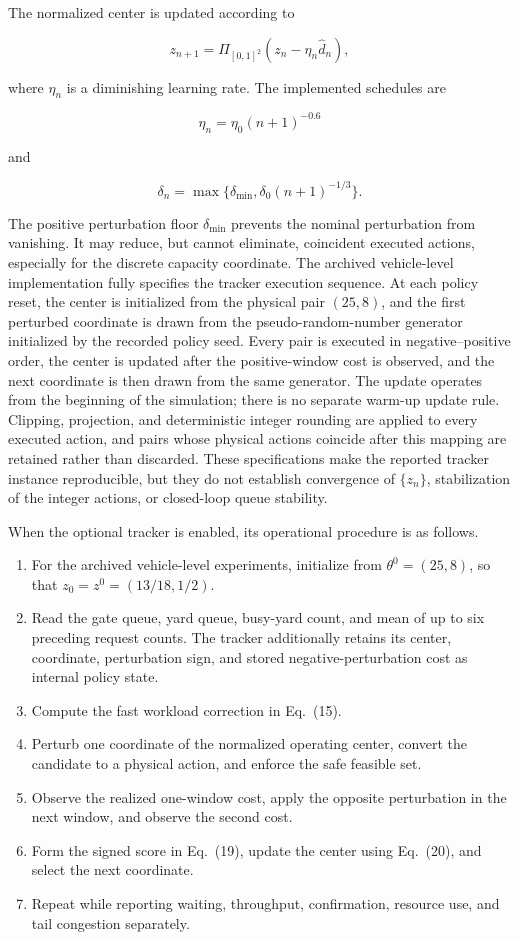 \documentclass[preprint,12pt,authoryear,a4paper]{elsarticle}
\begin{document}
The normalized center is updated according to

\[
z_{n+1}
=\Pi_{[0,1]^2}
\left(z_n-\eta_n\widehat d_n\right),
\tag{20}
\]

where \(\eta_n\) is a diminishing learning rate. The implemented schedules are

\[
\eta_n=\eta_0(n+1)^{-0.6}
\tag{21}
\]

and

\[
\delta_n=\max\{\delta_{\min},\delta_0(n+1)^{-1/3}\}.
\tag{22}
\]

The positive perturbation floor \(\delta_{\min}\) prevents the nominal perturbation from vanishing. It may reduce, but cannot eliminate, coincident executed actions, especially for the discrete capacity coordinate. The archived vehicle-level implementation fully specifies the tracker execution sequence. At each policy reset, the center is initialized from the physical pair \((25,8)\), and the first perturbed coordinate is drawn from the pseudo-random-number generator initialized by the recorded policy seed. Every pair is executed in negative--positive order, the center is updated after the positive-window cost is observed, and the next coordinate is then drawn from the same generator. The update operates from the beginning of the simulation; there is no separate warm-up update rule. Clipping, projection, and deterministic integer rounding are applied to every executed action, and pairs whose physical actions coincide after this mapping are retained rather than discarded. These specifications make the reported tracker instance reproducible, but they do not establish convergence of \(\{z_n\}\), stabilization of the integer actions, or closed-loop queue stability.

When the optional tracker is enabled, its operational procedure is as follows.

\begin{enumerate}[leftmargin=*,itemsep=2pt,topsep=3pt]
\item For the archived vehicle-level experiments, initialize from \(\theta^0=(25,8)\), so that \(z_0=z^0=(13/18,1/2)\).
\item Read the gate queue, yard queue, busy-yard count, and mean of up to six preceding request counts. The tracker additionally retains its center, coordinate, perturbation sign, and stored negative-perturbation cost as internal policy state.
\item Compute the fast workload correction in Eq.~(15).
\item Perturb one coordinate of the normalized operating center, convert the candidate to a physical action, and enforce the safe feasible set.
\item Observe the realized one-window cost, apply the opposite perturbation in the next window, and observe the second cost.
\item Form the signed score in Eq.~(19), update the center using Eq.~(20), and select the next coordinate.
\item Repeat while reporting waiting, throughput, confirmation, resource use, and tail congestion separately.
\end{enumerate}
\end{document}
